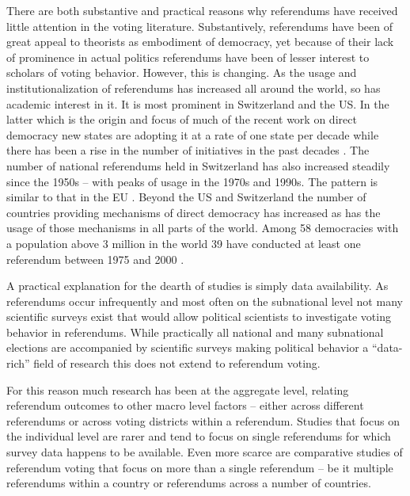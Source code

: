 \documentclass[11pt,a4paper]{article}\usepackage[]{graphicx}\usepackage[]{color}
\begin{document}
    There are both substantive and practical reasons why referendums have received little attention in the voting literature. Substantively, referendums have been of great appeal to theorists as embodiment of democracy, yet because of their lack of prominence in actual politics referendums have been of lesser interest to scholars of voting behavior. However, this is changing. 
    As the usage and institutionalization of referendums has increased all around the world, so has academic interest in it. It is most prominent in Switzerland and the US. In the latter which is the origin and focus of much of the recent work on direct democracy new states are adopting it at a rate of one state per decade while there has been a rise in the number of initiatives in the past decades \citep{matsusaka_direct_2005}. The number of national referendums held in Switzerland has also increased steadily since the 1950s – with peaks of usage in the 1970s and 1990s. The pattern is similar to that in the EU \citep{leininger_direct_2015}. Beyond the US and Switzerland the number of countries providing mechanisms of direct democracy has increased as has the usage of those mechanisms in all parts of the world. Among 58 democracies with a population above 3 million in the world 39 have conducted at least one referendum between 1975 and 2000 \citep[29]{altman_direct_2010}. %
		
    A practical explanation for the dearth of studies is simply data availability. As referendums occur infrequently and most often on the subnational level not many scientific surveys exist that would allow political scientists to investigate voting behavior in referendums. While practically all national and many subnational elections are accompanied by scientific surveys making political behavior a ``data-rich'' \citep[4]{dalton_citizens_2007} field of research this does not extend to referendum voting. 
	
	For this reason much research has been at the aggregate level, relating referendum outcomes to other macro level factors -- either across different referendums or across voting districts within a referendum. Studies that focus on the individual level are rarer and tend to focus on single referendums for which survey data happens to be available. %
    Even more scarce are comparative studies of referendum voting that focus on more than a single referendum -- be it multiple referendums within a country or referendums across a number of countries.
    
\end{document}
